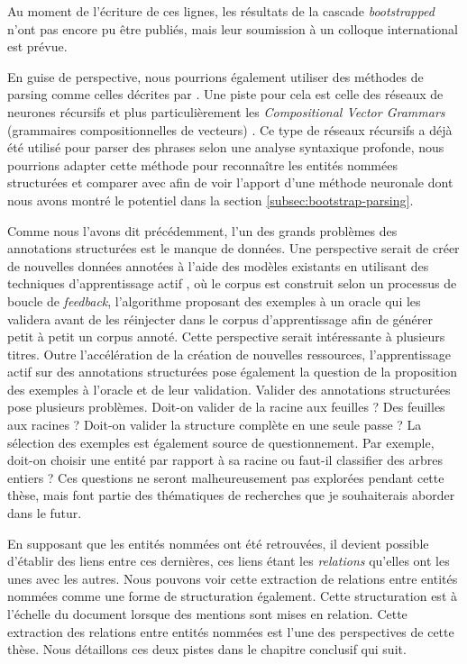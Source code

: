 \documentclass[12pt,a4paper,times,twoside,openright]{report}
\begin{document}
Au moment de l'écriture de ces lignes, les résultats de la cascade \emph{bootstrapped} n'ont pas encore pu être publiés, mais leur soumission à un colloque international est prévue.

En guise de perspective, nous pourrions également utiliser des méthodes de parsing comme celles décrites par \citet{dinarelli2012}. Une piste pour cela est celle des réseaux de neurones récursifs \citep{socher2011parsing} et plus particulièrement les \textit{Compositional Vector Grammars} (grammaires compositionnelles de vecteurs) \citep{socher2013parsing}. Ce type de réseaux récursifs a déjà été utilisé pour parser des phrases selon une analyse syntaxique profonde, nous pourrions adapter cette méthode pour reconnaître les entités nommées structurées et comparer avec \citet{dinarelli2012} afin de voir l'apport d'une méthode neuronale dont nous avons montré le potentiel dans la section \ref{subsec:bootstrap-parsing}.

Comme nous l'avons dit précédemment, l'un des grands problèmes des annotations structurées est le manque de données. Une perspective serait de créer de nouvelles données annotées à l'aide des modèles existants en utilisant des techniques d'apprentissage actif \citep{angluin1987learning,mackay1992information}, où le corpus est construit selon un processus de boucle de \textit{feedback}, l'algorithme proposant des exemples à un oracle qui les validera avant de les réinjecter dans le corpus d'apprentissage afin de générer petit à petit un corpus annoté. Cette perspective serait intéressante à plusieurs titres. Outre l'accélération de la création de nouvelles ressources, l'apprentissage actif sur des annotations structurées pose également la question de la proposition des exemples à l'oracle et de leur validation. Valider des annotations structurées pose plusieurs problèmes. Doit-on valider de la racine aux feuilles ? Des feuilles aux racines ? Doit-on valider la structure complète en une seule passe ? La sélection des exemples est également source de questionnement. Par exemple, doit-on choisir une entité par rapport à sa racine ou faut-il classifier des arbres entiers ? Ces questions ne seront malheureusement pas explorées pendant cette thèse, mais font partie des thématiques de recherches que je souhaiterais aborder dans le futur.

En supposant que les entités nommées ont été retrouvées, il devient possible d'établir des liens entre ces dernières, ces liens étant les \emph{relations} qu'elles ont les unes avec les autres. Nous pouvons voir cette extraction de relations entre entités nommées comme une forme de structuration également. Cette structuration est à l'échelle du document lorsque des mentions sont mises en relation. Cette extraction des relations entre entités nommées est l'une des perspectives de cette thèse. Nous détaillons ces deux pistes dans le chapitre conclusif qui suit.
\end{document}
